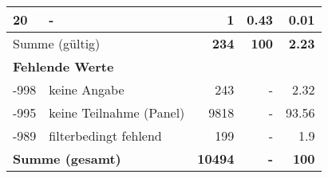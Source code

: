 \begin{longtable}{lXrrr}
     20 &
     \multicolumn{1}{X}{ -  } &


       \num{1} &
       \num[round-mode=places,round-precision=2]{0.43} &
         \num[round-mode=places,round-precision=2]{0.01} \\
     \midrule
     \multicolumn{2}{l}{Summe (gültig)} &
       \textbf{\num{234}} &
     \textbf{\num{100}} &
       \textbf{\num[round-mode=places,round-precision=2]{2.23}} \\
     \multicolumn{5}{l}{\textbf{Fehlende Werte}}\\
       -998 &
       keine Angabe &
         \num{243} &
        - &
         \num[round-mode=places,round-precision=2]{2.32} \\
       -995 &
       keine Teilnahme (Panel) &
         \num{9818} &
        - &
         \num[round-mode=places,round-precision=2]{93.56} \\
       -989 &
       filterbedingt fehlend &
         \num{199} &
        - &
         \num[round-mode=places,round-precision=2]{1.9} \\
     \midrule
     \multicolumn{2}{l}{\textbf{Summe (gesamt)}} &
          \textbf{\num{10494}} &
        \textbf{-} &
        \textbf{\num{100}} \\
     \bottomrule
     \end{longtable}
     
